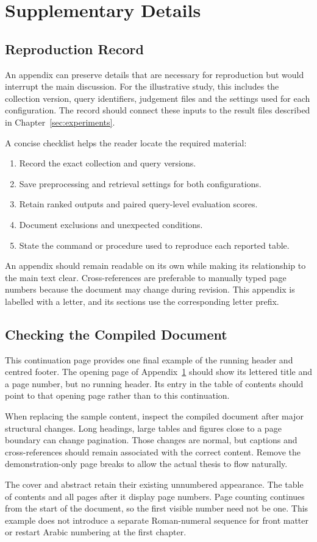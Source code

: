 \chapter{Supplementary Details}
\label{app:details}

\section{Reproduction Record}
An appendix can preserve details that are necessary for reproduction but would
interrupt the main discussion. For the illustrative study, this includes the
collection version, query identifiers, judgement files and the settings used
for each configuration. The record should connect these inputs to the result
files described in Chapter~\ref{sec:experiments}.

A concise checklist helps the reader locate the required material:
\begin{enumerate}
  \item Record the exact collection and query versions.
  \item Save preprocessing and retrieval settings for both configurations.
  \item Retain ranked outputs and paired query-level evaluation scores.
  \item Document exclusions and unexpected conditions.
  \item State the command or procedure used to reproduce each reported table.
\end{enumerate}

An appendix should remain readable on its own while making its relationship
to the main text clear. Cross-references are preferable to manually typed page
numbers because the document may change during revision. This appendix is
labelled with a letter, and its sections use the corresponding letter prefix.

\newpage
\section{Checking the Compiled Document}
This continuation page provides one final example of the running header and
centred footer. The opening page of Appendix~\ref{app:details} should show its
lettered title and a page number, but no running header. Its entry in the table
of contents should point to that opening page rather than to this continuation.

When replacing the sample content, inspect the compiled document after major
structural changes. Long headings, large tables and figures close to a page
boundary can change pagination. Those changes are normal, but captions and
cross-references should remain associated with the correct content. Remove
the demonstration-only page breaks to allow the actual thesis to flow naturally.

The cover and abstract retain their existing unnumbered appearance. The table
of contents and all pages after it display page numbers. Page counting
continues from the start of the document, so the first visible number need not
be one. This example does not introduce a separate Roman-numeral sequence for
front matter or restart Arabic numbering at the first chapter.
